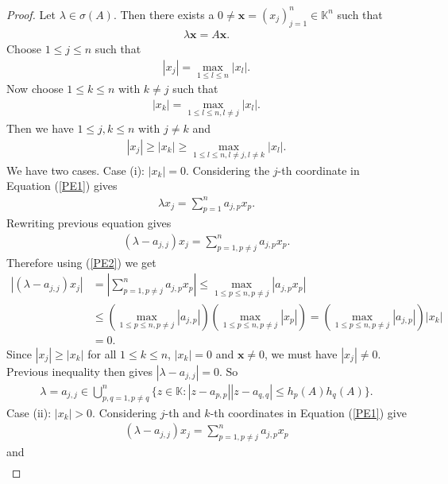 \documentclass{amsart}
\begin{document}
\begin{proof}
Let $\lambda \in \sigma(A)$. Then there exists a $0\neq \textbf{x} =(x_j)_{j=1}^n \in \mathbb{K}^n$ such that 
\begin{align}\label{PE1}
	\lambda \textbf{x} =A\textbf{x}.
\end{align}
Choose $1\leq j \leq n$ such that 
\begin{align*}
	 |x_j|=\max_{1\leq l \leq n}|x_l|.
\end{align*}
Now choose $1\leq k \leq n$ with $k \neq j$ such that 
\begin{align*}
	|x_k|=\max_{1\leq l \leq n, l\neq j}|x_l|.
\end{align*}
Then we have $1\leq j, k \leq n$ with $j \neq k$ and 
\begin{align}\label{PE2}
	|x_j|\geq |x_k|\geq \max_{1\leq l \leq n, l\neq j, l \neq k}|x_l|.
\end{align}
We have two cases. Case (i): $ |x_k|=0$. Considering the $j$-th coordinate in Equation (\ref{PE1}) gives 
\begin{align*}
	\lambda x_j=\sum_{p=1}^na_{j,p}x_p.
\end{align*}
Rewriting previous equation gives 
\begin{align*}
	(\lambda -a_{j,j})x_j=\sum_{p=1, p\neq j}^na_{j,p}x_p.
\end{align*}
Therefore using (\ref{PE2}) we get
\begin{align*}
	|(\lambda -a_{j,j})x_j|&=\left|\sum_{p=1, p\neq j}^na_{j,p}x_p\right|\leq \max_{1\leq p \leq n, p \neq j}|a_{j,p}x_p|\\
	&\leq \left(\max_{1\leq p \leq n, p \neq j}|a_{j,p}|\right)\left(\max_{1\leq p \leq n, p \neq j}|x_p|\right)=\left(\max_{1\leq p \leq n, p \neq j}|a_{j,p}|\right)|x_k|\\
	&=0.
\end{align*}
Since $	|x_j|\geq |x_k|$ for all $1\leq k \leq n$,  $ |x_k|=0$ and $\textbf{x}\neq 0$, we must have $|x_j|\neq 0$. Previous inequality then gives $	|\lambda -a_{j,j}|=0$. So 
\begin{align*}
\lambda =a_{j,j} \in \bigcup_{p, q=1, p \neq q}^n\{z \in \mathbb{K}: |z-a_{p,p}||z-a_{q,q}|\leq h_p(A)h_q(A)\}.
\end{align*}
Case (ii): $ |x_k|>0$. Considering $j$-th and $k$-th coordinates in Equation (\ref{PE1}) give
\begin{align}\label{PE3}
	(\lambda -a_{j,j})x_j=\sum_{p=1, p\neq j}^na_{j,p}x_p
\end{align}
and 
\begin{align}\label{PE4}

\end{align}
\end{proof}
\end{document}
